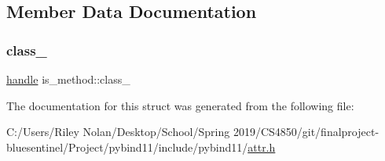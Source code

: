\subsection{Member Data Documentation}
\mbox{\label{structis__method_afc73c1a3bd92b1dc49872a16bdeeba0c}} 
\subsubsection{\texorpdfstring{class\_}{class\_}}
{\footnotesize\ttfamily \mbox{\hyperlink{classhandle}{handle}} is\+\_\+method\+::class\+\_\+}



The documentation for this struct was generated from the following file\+:\begin{DoxyCompactItemize}
\item 
C\+:/\+Users/\+Riley Nolan/\+Desktop/\+School/\+Spring 2019/\+C\+S4850/git/finalproject-\/bluesentinel/\+Project/pybind11/include/pybind11/\mbox{\hyperlink{attr_8h}{attr.\+h}}\end{DoxyCompactItemize}
